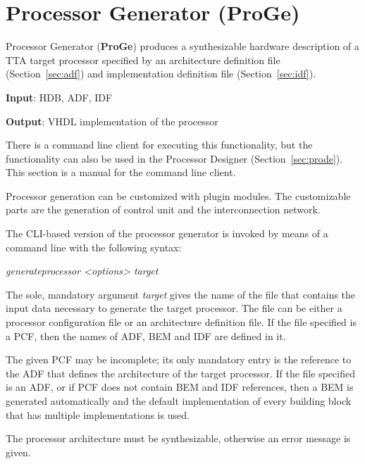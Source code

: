 \documentclass[twoside]{tceusermanual}
\begin{document}
\section{Processor Generator (ProGe)}
\label{sec:proge}

Processor Generator (\textbf{ProGe}) produces a synthesizable hardware
description of a TTA target processor specified by an architecture
definition file (Section~\ref{sec:adf}) and implementation definition file
(Section~\ref{sec:idf}).

\textbf{Input}: HDB, ADF, IDF

\textbf{Output}: VHDL implementation of the processor

There is a command line client for executing this functionality, but the
functionality can also be used in the Processor Designer
(Section~\ref{sec:prode}). This section is a manual for the command line
client.

Processor generation can be customized with plugin modules. The customizable
parts are the generation of control unit and the interconnection network.

The CLI-based version of the processor generator is invoked by means of a
command line with the following syntax:

  \textit{generateprocessor <options> target}

The sole, mandatory argument \emph{target} gives the name of the file that
contains the input data necessary to generate the target processor. The file
can be either a processor configuration file or an architecture definition
file. If the file specified is a PCF, then the names of ADF, BEM and IDF are
defined in it.

The given PCF may be incomplete; its only mandatory entry is the reference
to the ADF that defines the architecture of the target processor.  If the
file specified is an ADF, or if PCF does not contain BEM and IDF references,
then a BEM is generated automatically and the default implementation of every
building block that has multiple implementations is used.

The processor architecture must be synthesizable, otherwise an error message
is given. \\
\end{document}

